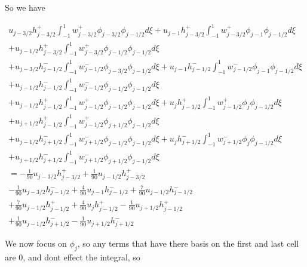 \documentclass[12pt]{article}
\begin{document}
So we have

\begin{multline*}
 u_{j - 3/2} h^+_{j - 3/2} \int_{-1}^{1} w^+_{j - 3/2} \phi_{j - 3/2} \phi_{j-1/2}d\xi + u_{j - 1} h^+_{j - 3/2} \int_{-1}^{1}w^+_{j - 3/2}\phi_{j - 1} \phi_{j-1/2}d\xi\\ + u_{j - 1/2} h^+_{j - 3/2} \int_{-1}^{1} w^+_{j - 3/2}\phi_{j - 1/2}\phi_{j-1/2}d\xi
\\ +u_{j - 3/2}h^-_{j - 1/2}\int_{-1}^{1}w^-_{j - 1/2}\phi_{j - 3/2}\phi_{j-1/2}d\xi + u_{j - 1}h^-_{j - 1/2}\int_{-1}^{1}w^-_{j - 1/2}\phi_{j - 1}\phi_{j-1/2}d\xi \\ + u_{j - 1/2}h^-_{j - 1/2}\int_{-1}^{1}w^-_{j - 1/2}\phi_{j - 1/2}\phi_{j-1/2}d\xi 
\\ +u_{j - 1/2}h^+_{j - 1/2}\int_{-1}^{1}w^+_{j - 1/2}\phi_{j - 1/2}\phi_{j-1/2}d\xi + u_{j}h^+_{j - 1/2}\int_{-1}^{1}w^+_{j - 1/2}\phi_{j }\phi_{j-1/2}d\xi \\+ u_{j + 1/2}h^+_{j - 1/2}\int_{-1}^{1}w^+_{j - 1/2}\phi_{j + 1/2}\phi_{j-1/2}d\xi 
\\ +u_{j - 1/2}h^-_{j + 1/2}\int_{-1}^{1}w^-_{j + 1/2} \phi_{j - 1/2}\phi_{j-1/2}d\xi + u_{j}h^-_{j + 1/2}\int_{-1}^{1}w^-_{j + 1/2} \phi_{j }\phi_{j-1/2}d\xi\\ + u_{j + 1/2}h^-_{j + 1/2}\int_{-1}^{1}w^-_{j + 1/2} \phi_{j + 1/2} \phi_{j-1/2}
d\xi  \\ =  -\frac{1}{90}u_{j - 3/2} h^+_{j - 3/2}  + \frac{1}{90}u_{j - 1/2} h^+_{j - 3/2}\\
 -\frac{1}{90}u_{j - 3/2}h^-_{j - 1/2} + \frac{4}{90}u_{j - 1}h^-_{j - 1/2}  + \frac{7}{90}u_{j - 1/2}h^-_{j - 1/2} \\
 + \frac{7}{90}u_{j - 1/2}h^+_{j - 1/2} + \frac{4}{90}u_{j}h^+_{j - 1/2}  -\frac{1}{90}u_{j + 1/2}h^+_{j - 1/2}\\
 + \frac{1}{90}u_{j - 1/2}h^-_{j + 1/2}  -\frac{1}{90} u_{j + 1/2}h^-_{j + 1/2}
\end{multline*}


We now focus on $\phi_{j} $, so any terms that have there basis on the first and last cell are 0, and dont effect the integral, so
\end{document}
